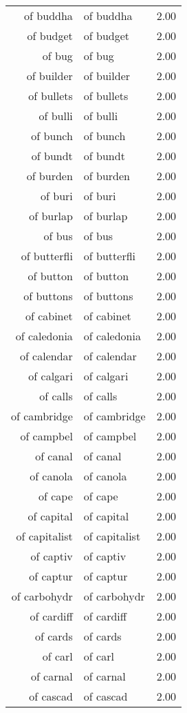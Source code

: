 \begin{table}[ht]
\begin{tabular}{rlr}
  of buddha & of buddha & 2.00 \\ 
  of budget & of budget & 2.00 \\ 
  of bug & of bug & 2.00 \\ 
  of builder & of builder & 2.00 \\ 
  of bullets & of bullets & 2.00 \\ 
  of bulli & of bulli & 2.00 \\ 
  of bunch & of bunch & 2.00 \\ 
  of bundt & of bundt & 2.00 \\ 
  of burden & of burden & 2.00 \\ 
  of buri & of buri & 2.00 \\ 
  of burlap & of burlap & 2.00 \\ 
  of bus & of bus & 2.00 \\ 
  of butterfli & of butterfli & 2.00 \\ 
  of button & of button & 2.00 \\ 
  of buttons & of buttons & 2.00 \\ 
  of cabinet & of cabinet & 2.00 \\ 
  of caledonia & of caledonia & 2.00 \\ 
  of calendar & of calendar & 2.00 \\ 
  of calgari & of calgari & 2.00 \\ 
  of calls & of calls & 2.00 \\ 
  of cambridge & of cambridge & 2.00 \\ 
  of campbel & of campbel & 2.00 \\ 
  of canal & of canal & 2.00 \\ 
  of canola & of canola & 2.00 \\ 
  of cape & of cape & 2.00 \\ 
  of capital & of capital & 2.00 \\ 
  of capitalist & of capitalist & 2.00 \\ 
  of captiv & of captiv & 2.00 \\ 
  of captur & of captur & 2.00 \\ 
  of carbohydr & of carbohydr & 2.00 \\ 
  of cardiff & of cardiff & 2.00 \\ 
  of cards & of cards & 2.00 \\ 
  of carl & of carl & 2.00 \\ 
  of carnal & of carnal & 2.00 \\ 
  of cascad & of cascad & 2.00 \\ 

\end{tabular}
\end{table}
